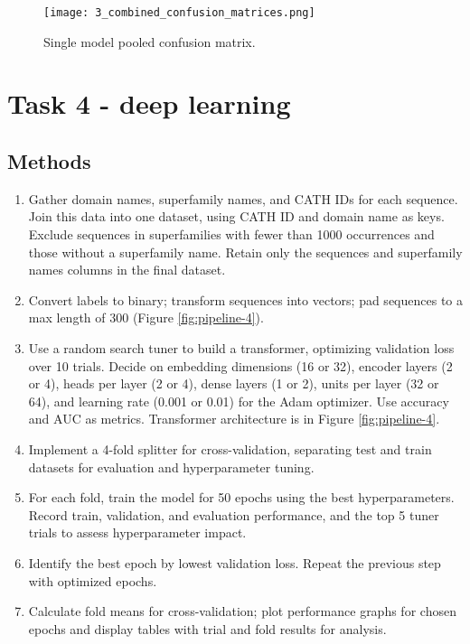 \documentclass[a4paper,12pt]{article}
\begin{document}
\begin{figure}[h]
  \centering
  \texttt{[image: 3\_combined\_confusion\_matrices.png]}
  \caption{Single model pooled confusion matrix.}
  \label{fig:pooled-confusion-matrix-3}
\end{figure}


\pagebreak
\section{Task 4 - deep learning}
\subsection{Methods}
\begin{enumerate}
    \item Gather domain names, superfamily names, and CATH IDs for each sequence. Join this data into one dataset, using CATH ID and domain name as keys. Exclude sequences in superfamilies with fewer than 1000 occurrences and those without a superfamily name. Retain only the sequences and superfamily names columns in the final dataset.
    \item Convert labels to binary; transform sequences into vectors; pad sequences to a max length of 300 (Figure \ref{fig:pipeline-4}).
    \item Use a random search tuner to build a transformer, optimizing validation loss over 10 trials. Decide on embedding dimensions (16 or 32), encoder layers (2 or 4), heads per layer (2 or 4), dense layers (1 or 2), units per layer (32 or 64), and learning rate (0.001 or 0.01) for the Adam optimizer. Use accuracy and AUC as metrics. Transformer architecture is in Figure \ref{fig:pipeline-4}.
    \item Implement a 4-fold splitter for cross-validation, separating test and train datasets for evaluation and hyperparameter tuning.
    \item For each fold, train the model for 50 epochs using the best hyperparameters. Record train, validation, and evaluation performance, and the top 5 tuner trials to assess hyperparameter impact.
    \item Identify the best epoch by lowest validation loss. Repeat the previous step with optimized epochs.
    \item Calculate fold means for cross-validation; plot performance graphs for chosen epochs and display tables with trial and fold results for analysis.
\end{enumerate}
\end{document}
